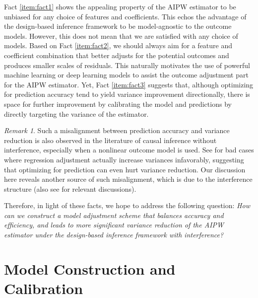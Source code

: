 \documentclass{article}
\theoremstyle{plain}
\theoremstyle{definition}
\theoremstyle{remark}
\newtheorem{remark}[theorem]{Remark}
\begin{document}
Fact \ref{item:fact1} shows the appealing property of the AIPW estimator to be unbiased for any choice of features and coefficients. This echos the advantage of the design-based inference framework to be model-agnostic to the outcome models.
However, this does not mean that we are satisfied with any choice of models. Based on Fact \ref{item:fact2}, we should always aim for a feature and coefficient combination that better adjusts for the potential outcomes and produces smaller scales of residuals. This naturally motivates the use of powerful machine learning or deep learning models to assist the outcome adjustment part for the AIPW estimator. Yet, Fact \ref{item:fact3} suggests that, although optimizing for prediction accuracy tend to yield variance improvement directionally, there is space for further improvement by calibrating the model and predictions by directly targeting the variance of the estimator. 

\begin{remark}
    Such a misalignment between prediction accuracy and variance reduction is also observed in the literature of causal inference without interference, especially when a nonlinear outcome model is used. See \citet{fogarty2018regression, guo2023generalized} for bad cases where regression adjustment actually increase variances infavorably, suggesting that optimizing for prediction can even hurt variance reduction. Our discussion here reveals another source of such misalignment, which is due to the interference structure (also see \citet{chang2023design,middleton2018unified} for relevant discussions). 
\end{remark}

Therefore, in light of these facts, we hope to address the following question: 
\emph{How can we construct a model adjustment scheme that balances accuracy and efficiency, and leads to more significant variance reduction of the AIPW estimator under the design-based inference framework with interference?}




\section{Model Construction and Calibration}\label{sec::calibration}
\end{document}
